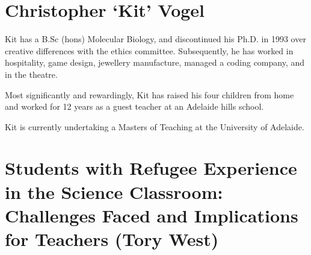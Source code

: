 \documentclass[twoside,12pt,a4paper,notitlepage]{memoir}
\begin{document}
\section*{Christopher `Kit' Vogel}

Kit has a B.Sc (hons) Molecular Biology, and discontinued his Ph.D. in 1993 over creative differences with the ethics committee. Subsequently, he has worked in hospitality, game design, jewellery manufacture, managed a coding company, and in the theatre.

Most significantly and rewardingly, Kit has raised his four children from home and worked for 12 years as a guest teacher at an Adelaide hills school.

Kit is currently undertaking a Masters of Teaching at the University of Adelaide.



\pagebreak
\section*{Students with Refugee Experience in the Science Classroom: Challenges Faced and Implications for Teachers (Tory West)}
\label{aut:west}
\end{document}
